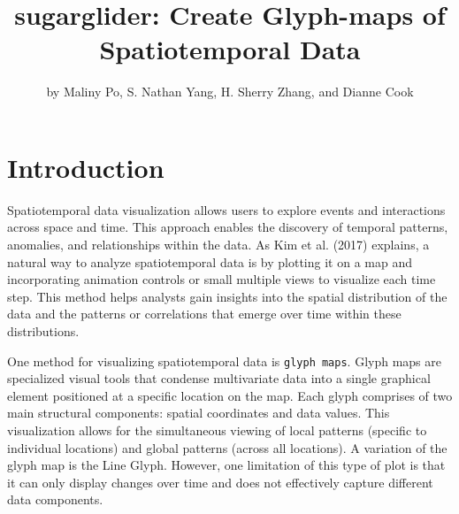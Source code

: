 \title{sugarglider: Create Glyph-maps of Spatiotemporal Data}


\author{by Maliny Po, S. Nathan Yang, H. Sherry Zhang, and Dianne Cook}

\maketitle


\hypertarget{introduction}{%
\section{Introduction}\label{introduction}}

Spatiotemporal data visualization allows users to explore events and interactions across space and time. This approach enables the discovery of temporal patterns, anomalies, and relationships within the data. As Kim et al. (2017) explains, a natural way to analyze spatiotemporal data is by plotting it on a map and incorporating animation controls or small multiple views to visualize each time step. This method helps analysts gain insights into the spatial distribution of the data and the patterns or correlations that emerge over time within these distributions.

One method for visualizing spatiotemporal data is \texttt{glyph\ maps}. Glyph maps are specialized visual tools that condense multivariate data into a single graphical element positioned at a specific location on the map. Each glyph comprises of two main structural components: spatial coordinates and data values. This visualization allows for the simultaneous viewing of local patterns (specific to individual locations) and global patterns (across all locations). A variation of the glyph map is the Line Glyph. However, one limitation of this type of plot is that it can only display changes over time and does not effectively capture different data components.

